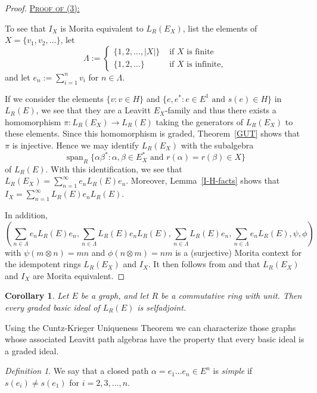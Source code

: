 \documentclass[11pt]{amsart}
\newtheorem{corollary}[theorem]{Corollary}
\theoremstyle{remark}
\newtheorem{definition}[theorem]{Definition}
\numberwithin{equation}{section}
\newcommand{\algspan}{\operatorname{span}}
\begin{document}
\begin{proof}
\smallskip 

\noindent \underline{\textsc{Proof of (3):}}  

To see that $I_X$ is Morita equivalent to $L_R(E_X)$, list the elements of $X = \{ v_ 1, v_2, \ldots \}$, let $$\Lambda := \begin{cases} \{1, 2, \ldots, |X| \} & \text{ if $X$ is finite} \\ \{ 1, 2, \ldots \} & \text{ if $X$ is infinite,} \end{cases}$$
and let $e_n := \sum_{i=1}^n v_i$ for $n \in \Lambda$.  

If we consider the elements $\{ v : v \in H \}$ and $\{ e, e^* : e \in E^1 \text{ and } s(e) \in H\}$ in $L_R(E)$, we see that they are a Leavitt $E_X$-family and thus there exists a homomorphism $\pi : L_R (E_X) \to L_R(E)$ taking the generators of $L_R(E_X)$ to these elements.  Since this homomorphism is graded, Theorem~\ref{GUT} shows that $\pi$ is injective.  Hence we may identify $L_R(E_X)$ with the subalgebra $$\algspan_R \{ \alpha \beta^* : \alpha, \beta \in E_X^* \text{ and } r(\alpha)=r(\beta) \in X  \}$$ of $L_R(E)$.  With this identification, we see that $L_R( E_X) = \sum_{n=1}^\infty e_n L_R(E) e_n$.  Moreover, Lemma~\ref{I-H-facts} shows that $I_X = \sum_{n=1}^\infty L_R(E) e_n L_R(E)$. 

In addition,
$$\left(\sum_{n \in \Lambda} e_n L_R(E) e_n, \sum_{n \in \Lambda} L_R(E) e_n L_R(E), \sum_{n \in \Lambda} L_R(E)e_n, \sum_{n \in \Lambda} e_n L_R(E), \psi, \phi \right)$$ with $\psi(m \otimes n) = mn$ and $\phi(n \otimes m) =nm$ is a (surjective) Morita context for the idempotent rings $L_R(E_X)$ and $I_X$.  It then follows from \cite[Proposition~2.5]{GS} and \cite[Proposition~2.7]{GS} that $L_R(E_X)$ and $I_X$ are Morita equivalent.

\end{proof}


\begin{corollary}
Let $E$ be a graph, and let $R$ be a commutative ring with unit. Then every graded basic ideal of $L_R(E)$ is selfadjoint.
\end{corollary}


Using the Cuntz-Krieger Uniqueness Theorem we can characterize those graphs whose associated Leavitt path algebras have the property that every basic ideal is a graded ideal.


\begin{definition}
We say that a closed path $\alpha = e_1 \ldots e_n \in E^n$ is \emph{simple} if $s(e_i) \neq s(e_1)$ for $i = 2, 3, \ldots, n$.
\end{definition}
\end{document}
